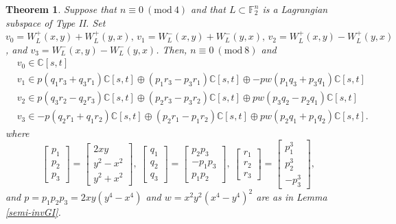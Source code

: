 \documentclass[a4paper,reqno]{amsart}
\newtheorem{theorem}{Theorem}[section]
\theoremstyle{definition}
\theoremstyle{remark} \newtheorem{remark}[theorem]{Remark}
\numberwithin{equation}{section}
\begin{document}
\begin{theorem}\label{W_L:n=0(8)}
    Suppose that \(n \equiv 0 \ (\mathrm{mod}\ 4)\) and that \(L \subset \mathbb{F}_2^n\) is a Lagrangian subspace of Type II. Set \(v_0 = W_L^+(x,y) + W_L^+(y,x),\, v_1 = W_L^-(x,y) + W_L^-(y,x),\, v_2 = W_L^+(x,y) - W_L^+(y,x)\), and \(v_3 = W_L^-(x,y) - W_L^-(y,x)\). Then, \(n \equiv 0 \ (\mathrm{mod}\ 8)\) and
    \begin{align*}
        &v_0 \in \mathbb{C}[s,t] \\
        &v_1 \in p(q_1r_3+q_3r_1)\mathbb{C}[s,t] \oplus (p_1r_3 - p_3r_1)\mathbb{C}[s,t] \oplus -pw(p_1q_3+p_3q_1)\mathbb{C}[s,t] \\
        &v_2 \in p(q_3r_2-q_2r_3)\mathbb{C}[s,t] \oplus (p_2r_3 - p_3r_2)\mathbb{C}[s,t] \oplus pw(p_3q_2-p_2q_1)\mathbb{C}[s,t] \\
        &v_3 \in -p(q_2r_1+q_1r_2)\mathbb{C}[s,t] \oplus (p_2r_1 - p_1r_2)\mathbb{C}[s,t] \oplus pw(p_2q_1+p_1q_2)\mathbb{C}[s,t].
    \end{align*}
    where
    \begin{equation*}
        \begin{bmatrix}
            p_1 \\
            p_2 \\
            p_3
        \end{bmatrix}
        =
        \begin{bmatrix}
            2xy \\
            y^2-x^2 \\
            y^2+x^2
        \end{bmatrix}, \:
        \begin{bmatrix}
            q_1 \\
            q_2 \\
            q_3
        \end{bmatrix}
        =
        \begin{bmatrix}
            p_2p_3 \\
            -p_1p_3 \\
            p_1p_2
        \end{bmatrix}, \:
        \begin{bmatrix}
            r_1 \\
            r_2 \\
            r_3
        \end{bmatrix}
        =
        \begin{bmatrix}
            p_1^3 \\
            p_2^3 \\
            -p_3^3
        \end{bmatrix},
    \end{equation*}
    and \(p = p_1p_2p_3 = 2xy(y^4-x^4)\) and \(w = x^2y^2(x^4-y^4)^2\) are as in Lemma \ref{semi-invGI}. 
\end{theorem}
\end{document}
